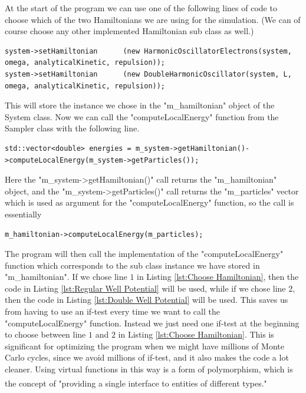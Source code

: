 \documentclass[../main.tex]{subfiles}
\begin{document}
At the start of the program we can use one of the following lines of code to choose which of the two Hamiltonians we are using for the simulation. (We can of course choose any other implemented Hamiltonian sub class as well.)
\lstset{language=c++}
\begin{lstlisting}[caption={Setting the Hamiltonian of the system.}, label={lst:Choose Hamiltonian}]
system->setHamiltonian      (new HarmonicOscillatorElectrons(system, omega, analyticalKinetic, repulsion));
system->setHamiltonian      (new DoubleHarmonicOscillator(system, L, omega, analyticalKinetic, repulsion));
\end{lstlisting}
This will store the instance we chose in the "m\_hamiltonian" object of the System class. Now we can call the "computeLocalEnergy" function from the Sampler class with the following line.
\lstset{language=c++}
\begin{lstlisting}[caption={Calling the "computeLocalEnergy" function from the Sampler class. The function implementation used will be the one belonging to the Hamiltonian sub class we have chosen as the Hamiltonian of the system.}]
std::vector<double> energies = m_system->getHamiltonian()->computeLocalEnergy(m_system->getParticles());
\end{lstlisting}
Here the "m\_system->getHamiltonian()" call returns the "m\_hamiltonian" object, and the "m\_system->getParticles()" call returns the "m\_particles" vector which is used as argument for the "computeLocalEnergy" function, so the call is essentially 
\begin{lstlisting}
m_hamiltonian->computeLocalEnergy(m_particles);
\end{lstlisting}
The program will then call the implementation of the "computeLocalEnergy" function which corresponds to the sub class instance we have stored in "m\_hamiltonian". If we chose line $1$ in Listing \ref{lst:Choose Hamiltonian}, then the code in Listing \ref{lst:Regular Well Potential} will be used, while if we chose line $2$, then the code in Listing \ref{lst:Double Well Potential} will be used. This saves us from having to use an if-test every time we want to call the "computeLocalEnergy" function. Instead we just need one if-test at the beginning to choose between line $1$ and $2$ in Listing \ref{lst:Choose Hamiltonian}. This is significant for optimizing the program when we might have millions of Monte Carlo cycles, since we avoid millions of if-test, and it also makes the code a lot cleaner. Using virtual functions in this way is a form of polymorphism, which is the concept of "providing a single interface to entities of different types."\textsuperscript{\cite{Stroustrup}}
\end{document}
